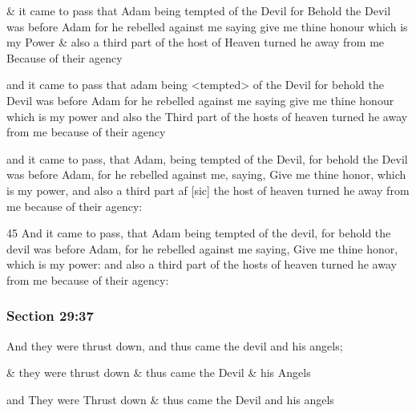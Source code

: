 		\begin{framed}
		\scriptsize
			\begin{compactdesc}
				\item[JSP] \& it came to pass that Adam being tempted of the Devil for Behold the Devil was before Adam for he rebelled against me saying give me thine honour which is my Power \& also a third part of the host of Heaven turned he away from me Because of their agency
				\item[HSN] and it came to pass that adam being <tempted> of the Devil for behold the Devil was before Adam for he rebelled against me saying give me thine honour which is my power and also the Third part of the hosts of heaven turned he away from me because of their agency
				\item[EMS] and it came to pass, that Adam, being tempted of the Devil, for behold the Devil was before Adam, for he rebelled against me, saying, Give me thine honor, which is my power, and also a third part af [sic] the host of heaven turned he away from me because of their agency:
				\item[BC] 45 And it came to pass, that Adam being tempted of the devil, for behold the devil was before Adam, for he rebelled against me saying, Give me thine honor, which is my power: and also a third part of the hosts of heaven turned he away from me because of their agency:
			\end{compactdesc}
		\end{framed}

	\subsubsection{Section 29:37} %
		\label{DC29-37}

		And they were thrust down, and thus came the devil and his angels;

		\begin{framed}
		\scriptsize
			\begin{compactdesc}
				\item[JSP] \& they were thrust down \& thus came the Devil \& his Angels
				\item[HSN] and They were Thrust down \& thus came the Devil and his angels
			\end{compactdesc}
		\end{framed}

